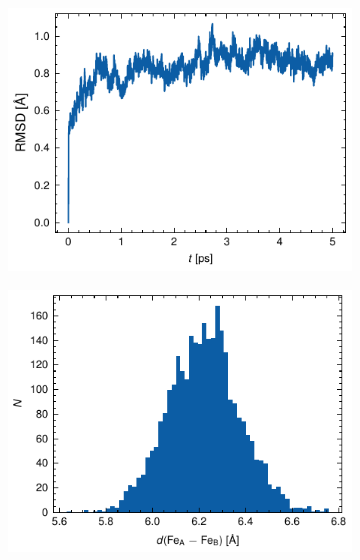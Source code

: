 \begin{figure}[htbp]
    \centering
    \begin{subfigure}{.49\textwidth}
        \centering
        \includegraphics{Figures/A_rmsd.pdf}
    \end{subfigure}
    \begin{subfigure}{.49\textwidth}
        \centering
        \includegraphics{Figures/A_fe-fe_hist.pdf}
    \end{subfigure}
    \par\bigskip
    \begin{subfigure}{.49\textwidth}
        \centering

\end{subfigure}
\end{figure}
